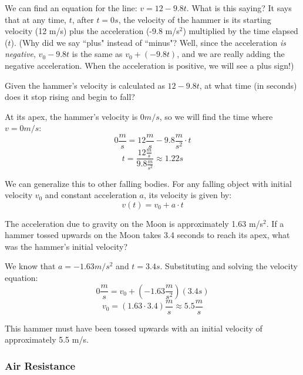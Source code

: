 We can find an equation for the line: $v = 12 - 9.8t$. What is this saying? It 
says that at any time, $t$, after $t=0s$, the velocity of the hammer is its 
starting velocity (12 m/s) plus the acceleration (-9.8 m/s$^2$) multiplied by 
the time elapsed ($t$). (Why did we say ``plus" instead of ``minus"? Well, 
since the acceleration \textit{is negative}, $v_0-9.8t$ is the same as $v_0 + 
\left( -9.8t \right)$, and we are really adding the negative acceleration. When 
the acceleration is positive, we will see a plus sign!)

\begin{Exercise}[title={When is the apex of flight?}, label=vapex]
  Given the hammer's velocity is calculated as $12 - 9.8t$, at what time (in 
  seconds) does it stop rising and begin to fall?
\end{Exercise}
\begin{Answer}[ref=vapex]
  At its apex, the hammer's velocity is $0 m/s$, so we will find the time 
  where $v=0m/s$:
  $$0 \frac{m}{s} = 12 \frac{m}{s} - 9.8 \frac{m}{s^2} \cdot t$$
  $$t = \frac{12 \frac{m}{s}}{9.8 \frac{m}{s^2}} \approx 1.22s$$
\end{Answer}

We can generalize this to other falling bodies. For any falling object with 
initial velocity  $v_0$ and constant acceleration $a$, its velocity is given 
by:
$$v(t) = v_0 + a \cdot t$$

\begin{Worked}
\begin{Problem}
The acceleration due to gravity on the Moon is approximately 
1.63 m/s$^2$. If a hammer tossed upwards on the Moon takes 3.4 seconds to reach 
its apex, what was the hammer's initial velocity?
\end{Problem}
\begin{Solution}
We know that $a = -1.63 m/s^2$ and $t = 3.4s$. Substituting 
and solving the velocity equation:
$$0 \frac{m}{s} = v_0 + \left( -1.63 \frac{m}{s^2} \right) \left( 3.4 s \right)$$
$$v_0 = \left( 1.63 \cdot 3.4 \right) \frac{m}{s} \approx 5.5 \frac{m}{s}$$

This hammer must have been tossed upwards with an initial velocity of 
approximately 5.5 m/s.
\end{Solution}
\end{Worked}

\subsubsection{Air Resistance}

